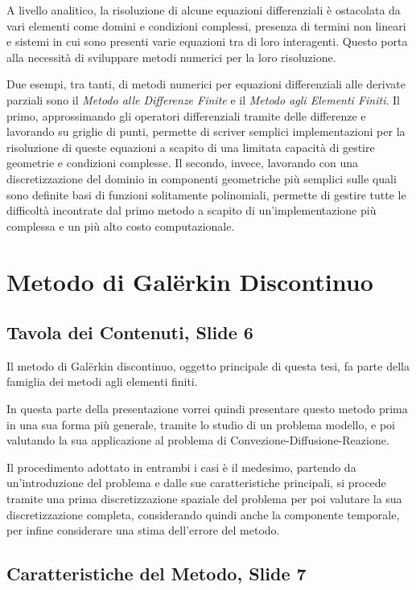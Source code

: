 \documentclass[12pt]{article}
\begin{document}
    A livello analitico, la risoluzione di alcune equazioni differenziali è ostacolata da vari elementi come domini e condizioni complessi, presenza di termini non lineari e sistemi in cui sono presenti varie equazioni tra di loro interagenti. Questo porta alla necessità di sviluppare metodi numerici per la loro risoluzione.

    Due esempi, tra tanti, di metodi numerici per equazioni differenziali alle derivate parziali sono il \textit{Metodo alle Differenze Finite} e il \textit{Metodo agli Elementi Finiti}. Il primo, approssimando gli operatori differenziali tramite delle differenze e lavorando su griglie di punti, permette di scriver semplici implementazioni per la risoluzione di queste equazioni a scapito di una limitata capacità di gestire geometrie e condizioni complesse. Il secondo, invece, lavorando con una discretizzazione del dominio in componenti geometriche più semplici sulle quali sono definite basi di funzioni solitamente polinomiali, permette di gestire tutte le difficoltà incontrate dal primo metodo a scapito di un'implementazione più complessa e un più alto costo computazionale.

    \newpage
    \section{Metodo di Galërkin Discontinuo}

    \subsection{Tavola dei Contenuti, Slide 6}

    Il metodo di Galërkin discontinuo, oggetto principale di questa tesi, fa parte della famiglia dei metodi agli elementi finiti.

    In questa parte della presentazione vorrei quindi presentare questo metodo prima in una sua forma più generale, tramite lo studio di un problema modello, e poi valutando la sua applicazione al problema di Convezione-Diffusione-Reazione. 

    Il procedimento adottato in entrambi i casi è il medesimo, partendo da un'introduzione del problema e dalle sue caratteristiche principali, si procede tramite una prima discretizzazione spaziale del problema per poi valutare la sua discretizzazione completa, considerando quindi anche la componente temporale, per infine considerare una stima dell'errore del metodo.

    \subsection{Caratteristiche del Metodo, Slide 7}
\end{document}
